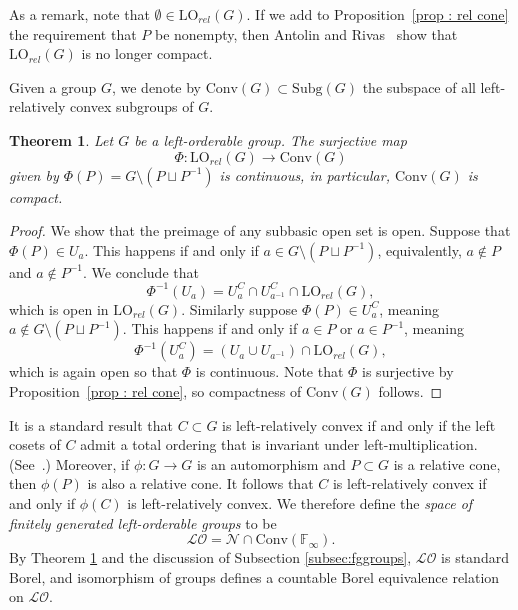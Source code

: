 \documentclass{amsart}
\newtheorem{theorem}{Theorem}[section]
\theoremstyle{definition}
\theoremstyle{remark}
\begin{document}
As a remark, note that $\emptyset \in \mathrm{LO}_{rel}(G)$.  If we add to Proposition~\ref{prop : rel cone} the requirement that $P$ be nonempty, then Antolin and Rivas~\cite{AntRiv} show that $\mathrm{LO}_{rel}(G)$ is no longer compact.  

Given a group $G$, we denote by $\mathrm{Conv}(G) \subset \mathrm{Subg}(G)$ the subspace of all left-relatively convex subgroups of $G$. 

\begin{theorem}
\label{thm:compactconvex}
Let $G$ be a left-orderable group.  The surjective map 
\[ \Phi \colon \mathrm{LO}_{rel}(G) \rightarrow \mathrm{Conv}(G)
\]
given by $\Phi(P) = G\setminus(P \sqcup P^{-1})$ is continuous, in particular, $\mathrm{Conv}(G)$ is compact.
\end{theorem}
\begin{proof}
    We show that the preimage of any subbasic open set is open. %
Suppose that $\Phi(P) \in U_a$.  This happens if and only if $a \in G \setminus (P \sqcup P^{-1})$, equivalently, $a \notin P$ and $a \notin P^{-1}$.  We conclude that 
    \[\Phi^{-1}(U_a) = U_a^C \cap U_{a^{-1}}^C \cap \mathrm{LO}_{rel}(G),
\]
which is open in $\mathrm{LO}_{rel}(G)$.
Similarly suppose  $\Phi(P) \in U_a^C$, meaning $a \notin G \setminus (P \sqcup P^{-1})$.  This happens if and only if $a \in P$ or $a \in P^{-1}$, meaning 
   \[\Phi^{-1}(U_a^C) = (U_a \cup U_{a^{-1}} )\cap \mathrm{LO}_{rel}(G),
\]
    which is again open so that $\Phi$ is continuous.  Note that $\Phi$ is surjective by Proposition~\ref{prop : rel cone}, so compactness of $\mathrm{Conv}(G)$ follows.
\end{proof}


It is a standard result that $C \subset G $ is left-relatively convex if and only if the left cosets of $C$ admit a total ordering that is invariant under left-multiplication. (See~\cite[Chapter~2]{ClaRol}.)  Moreover, if $\phi : G \rightarrow G$ is an automorphism and $P \subset G$ is a relative cone, then $\phi(P)$ is also a relative cone.  It follows that $C$ is left-relatively convex if and only if $\phi(C)$ is left-relatively convex. We therefore define the \emph{space of finitely generated left-orderable groups} to be 
\[ \mathcal{LO} = \mathcal{N} \cap \mathrm{Conv}(\mathbb{F}_\infty).
\]
By Theorem \ref{thm:compactconvex} and the discussion of Subsection \ref{subsec:fggroups}, $\mathcal{LO}$ is standard Borel, and isomorphism of groups defines a countable Borel equivalence relation on $\mathcal{LO}$. 
\end{document}
